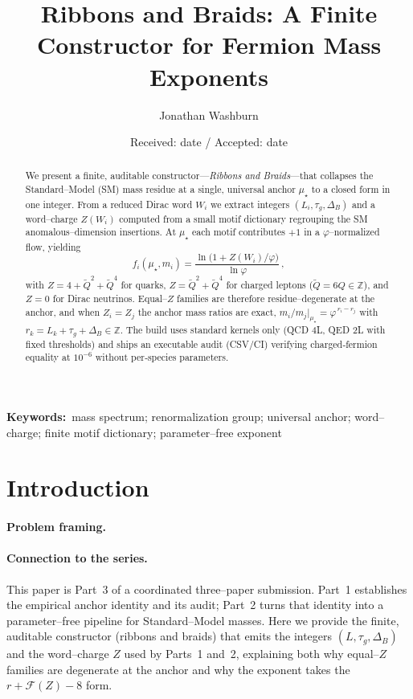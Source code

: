 \documentclass[epjc3]{svjour3}
\title{Ribbons and Braids: A Finite Constructor for Fermion Mass Exponents}
\author{Jonathan Washburn}
\institute{Recognition Science, Recognition Physics Institute, Austin, Texas, USA \\\email{jon@recognitionphysics.org}}
\date{Received: date / Accepted: date}
\newcommand{\keywords}[1]{\par\smallskip\noindent\textbf{Keywords:}~#1\par}
\begin{document}
\maketitle

\begin{abstract}
We present a finite, auditable constructor---\emph{Ribbons and Braids}---that collapses the Standard–Model (SM) mass residue at a single, universal anchor $\mu_\star$ to a closed form in one integer. From a reduced Dirac word $W_i$ we extract integers $(L_i,\tau_g,\Delta_B)$ and a word–charge $Z(W_i)$ computed from a small motif dictionary regrouping the SM anomalous–dimension insertions. At $\mu_\star$ each motif contributes $+1$ in a $\varphi$–normalized flow, yielding
\[
f_i(\mu_\star,m_i)=\frac{\ln\!\bigl(1+Z(W_i)/\varphi\bigr)}{\ln\varphi}\,,
\]
with $Z=4+\tilde Q^2+\tilde Q^4$ for quarks, $Z=\tilde Q^2+\tilde Q^4$ for charged leptons ($\tilde Q=6Q\in\mathbb Z$), and $Z=0$ for Dirac neutrinos. Equal–$Z$ families are therefore residue–degenerate at the anchor, and when $Z_i=Z_j$ the anchor mass ratios are exact, $m_i/m_j|_{\mu_\star}=\varphi^{\,r_i-r_j}$ with $r_k=L_k+\tau_g+\Delta_B\in\mathbb Z$. The build uses standard kernels only (QCD 4L, QED 2L with fixed thresholds) and ships an executable audit (CSV/CI) verifying charged‑fermion equality at $10^{-6}$ without per‑species parameters.
\end{abstract}

\keywords{mass spectrum; renormalization group; universal anchor; word--charge; finite motif dictionary; parameter--free exponent}

\section{Introduction}

\paragraph{Problem framing.}
\paragraph{Connection to the series.}
This paper is Part~3 of a coordinated three--paper submission. Part~1 establishes the empirical anchor identity and its audit; Part~2 turns that identity into a parameter--free pipeline for Standard--Model masses. Here we provide the finite, auditable constructor (ribbons and braids) that emits the integers $(L,\tau_g,\Delta_B)$ and the word--charge $Z$ used by Parts~1 and~2, explaining both why equal--$Z$ families are degenerate at the anchor and why the exponent takes the $r+\mathcal F(Z)-8$ form.
\end{document}
